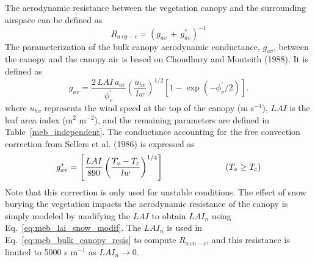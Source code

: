 The aerodynamic resistance between the vegetation canopy and the
surrounding airspace can be defined as
%
\begin{equation}
  \label{eq:meb_bulk_canopy_resis}
  R_{a\,vg-c} = {\left( g_{av} \,+\, g_{av}^\ast \right)}^{-1}
\end{equation}
%
The parameterization of the bulk canopy aerodynamic conductance, $g_{av}$, 
between the canopy and the canopy air is based on 
Choudhury and Monteith (1988)\nocite{Choudhury88}.
It is defined as
%
\begin{equation}
  \label{eq:meb_condrb}
  g_{av} = 
\frac{2 \, LAI \, a_{av}}{\phi_v^\prime}\left(\frac{u_{hv}}{lw}\right)^{1/2}[1-\exp(-\phi_v^\prime/2)].
\end{equation}
%
where 
$u_{hv}$ represents the wind speed at the top of the canopy
(m s$^{-1}$),
$LAI$ is the leaf area index (m$^{2}$ m$^{-2}$), and the remaining parameters are
defined in Table~\ref{meb_independent}.
%
The conductance accounting for the free convection correction
from Sellers et al. (1986)\nocite{Sellers86}
is expressed as
%
\begin{equation}
  \label{eq:meb_freeconv}
  g_{av}^\ast = \left[ \frac{LAI}{890} \left(\frac{T_{v} -
        T_{c}}{lw}\right)^{1/4}\right]
\hskip1.in \left( T_{v} \geq T_{c} \right)
\end{equation}
%
Note that this correction is only used for unstable conditions.
%
The effect of snow burying the vegetation impacts the aerodynamic
resistance of the canopy is simply modeled by modifying the $LAI$
to obtain $LAI_n$ using Eq.~\ref{eq:meb_lai_snow_modif}.
%
The $LAI_n$ is used in
Eq.~\ref{eq:meb_bulk_canopy_resis} to compute $R_{a\,vn-c}$, and this
resistance is limited to 5000 s m$^{-1}$ as $LAI_n \rightarrow 0$.




